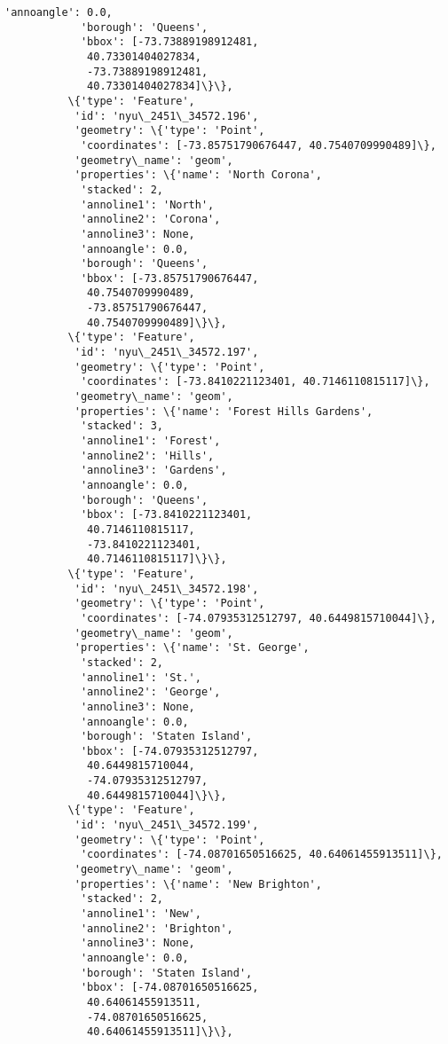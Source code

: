 \documentclass[11pt]{article}
\begin{document}
\begin{Verbatim}[commandchars=\\\{\}]
            'annoangle': 0.0,
            'borough': 'Queens',
            'bbox': [-73.73889198912481,
             40.73301404027834,
             -73.73889198912481,
             40.73301404027834]\}\},
          \{'type': 'Feature',
           'id': 'nyu\_2451\_34572.196',
           'geometry': \{'type': 'Point',
            'coordinates': [-73.85751790676447, 40.7540709990489]\},
           'geometry\_name': 'geom',
           'properties': \{'name': 'North Corona',
            'stacked': 2,
            'annoline1': 'North',
            'annoline2': 'Corona',
            'annoline3': None,
            'annoangle': 0.0,
            'borough': 'Queens',
            'bbox': [-73.85751790676447,
             40.7540709990489,
             -73.85751790676447,
             40.7540709990489]\}\},
          \{'type': 'Feature',
           'id': 'nyu\_2451\_34572.197',
           'geometry': \{'type': 'Point',
            'coordinates': [-73.8410221123401, 40.7146110815117]\},
           'geometry\_name': 'geom',
           'properties': \{'name': 'Forest Hills Gardens',
            'stacked': 3,
            'annoline1': 'Forest',
            'annoline2': 'Hills',
            'annoline3': 'Gardens',
            'annoangle': 0.0,
            'borough': 'Queens',
            'bbox': [-73.8410221123401,
             40.7146110815117,
             -73.8410221123401,
             40.7146110815117]\}\},
          \{'type': 'Feature',
           'id': 'nyu\_2451\_34572.198',
           'geometry': \{'type': 'Point',
            'coordinates': [-74.07935312512797, 40.6449815710044]\},
           'geometry\_name': 'geom',
           'properties': \{'name': 'St. George',
            'stacked': 2,
            'annoline1': 'St.',
            'annoline2': 'George',
            'annoline3': None,
            'annoangle': 0.0,
            'borough': 'Staten Island',
            'bbox': [-74.07935312512797,
             40.6449815710044,
             -74.07935312512797,
             40.6449815710044]\}\},
          \{'type': 'Feature',
           'id': 'nyu\_2451\_34572.199',
           'geometry': \{'type': 'Point',
            'coordinates': [-74.08701650516625, 40.64061455913511]\},
           'geometry\_name': 'geom',
           'properties': \{'name': 'New Brighton',
            'stacked': 2,
            'annoline1': 'New',
            'annoline2': 'Brighton',
            'annoline3': None,
            'annoangle': 0.0,
            'borough': 'Staten Island',
            'bbox': [-74.08701650516625,
             40.64061455913511,
             -74.08701650516625,
             40.64061455913511]\}\},

\end{Verbatim}
\end{document}
